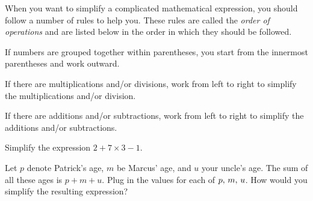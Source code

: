 \documentclass[a4paper,oneside,12pt]{article}
\begin{document}
When you want to simplify a complicated mathematical expression, you
should follow a number of rules to help you.  These rules are called
the \emph{order of operations} and are listed below in the order in
which they should be followed.
\begin{packedenumeral}
\item If numbers are grouped together within parentheses, you start
  from the innermost parentheses and work outward.

\item If there are multiplications and/or divisions, work from left to
  right to simplify the multiplications and/or division.

\item If there are additions and/or subtractions, work from left to
  right to simplify the additions and/or subtractions.
\end{packedenumeral}

\begin{exercise}
Simplify the expression $2 + 7 \times 3 - 1$.
\end{exercise}


\begin{exercise}
Let $p$ denote Patrick's age, $m$ be Marcus' age, and $u$ your uncle's
age.  The sum of all these ages is $p + m + u$.  Plug in the values
for each of ${p},\, {m},\, {u}$.  How would you simplify the resulting
expression?
\end{exercise}

\end{document}
